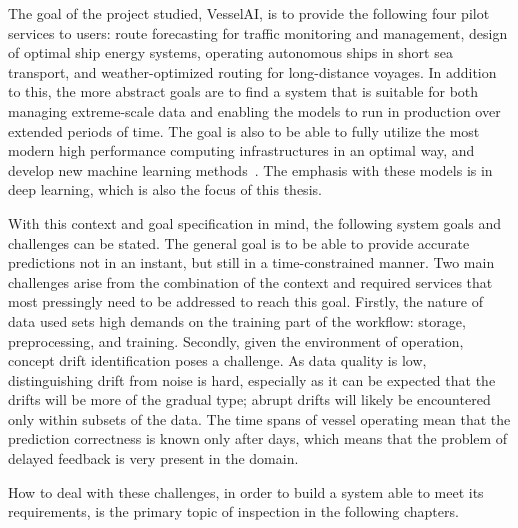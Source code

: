 The goal of the project studied, VesselAI, is to provide the following four pilot services to users: route forecasting for traffic monitoring and management, design of optimal ship energy systems, operating autonomous ships in short sea transport, and weather-optimized routing for long-distance voyages. In addition to this, the more abstract goals are to find a system that is suitable for both managing extreme-scale data and enabling the models to run in production over extended periods of time. The goal is also to be able to fully utilize the most modern high performance computing infrastructures in an optimal way, and develop new machine learning methods~\cite{D1.1}. The emphasis with these models is in deep learning, which is also the focus of this thesis.

With this context and goal specification in mind, the following system goals and challenges can be stated. The general goal is to be able to provide accurate predictions not in an instant, but still in a time-constrained manner. Two main challenges arise from the combination of the context and required services that most pressingly need to be addressed to reach this goal. Firstly, the nature of data used sets high demands on the training part of the workflow: storage, preprocessing, and training. Secondly, given the environment of operation, concept drift identification poses a challenge. As data quality is low, distinguishing drift from noise is hard, especially as it can be expected that the drifts will be more of the gradual type; abrupt drifts will likely be encountered only within subsets of the data. The time spans of vessel operating mean that the prediction correctness is known only after days, which means that the problem of delayed feedback is very present in the domain.

How to deal with these challenges, in order to build a system able to meet its requirements, is the primary topic of inspection in the following chapters.



